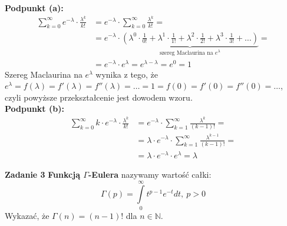 \documentclass[a4paper,12pt]{article}
\begin{document}
\noindent \textbf{Podpunkt (a):}
\begin{align*}
    \sum\limits_{k=0}^{\infty} e^{-\lambda} \cdot \frac{\lambda^k}{k!} &= 
    e^{-\lambda} \cdot \sum\limits_{k=0}^{\infty} \frac{\lambda^k}{k!} = \\ 
    &= e^{-\lambda} \cdot \underbrace{\left( \lambda^0 \cdot \frac{1}{0!} 
    + \lambda^1 \cdot \frac{1}{1!} + \lambda^2 \cdot \frac{1}{2!} 
    + \lambda^3 \cdot \frac{1}{3!} + \ldots \right)}_{\text{szereg Maclaurina na }
    e^\lambda} = \\
    &= e^{-\lambda} \cdot e^\lambda = e^{\lambda - \lambda} = e^0 = 1
\end{align*}
\noindent Szereg Maclaurina na $e^\lambda$ wynika z tego, że $e^\lambda = f(\lambda)
= f'(\lambda) = f''(\lambda) = \ldots = 1 = f(0) = f'(0) = f''(0) = \ldots$, czyli 
powyższe przekształcenie jest dowodem wzoru.\\

\noindent \textbf{Podpunkt (b):}
\begin{align*}
    \sum\limits_{k=0}^{\infty} k \cdot e^{-\lambda} \cdot \frac{\lambda^k}{k!} &=
    e^{-\lambda} \cdot \sum\limits_{k=1}^{\infty} \frac{\lambda^k}{(k-1)!} = \\
    &= \lambda \cdot e^{-\lambda} \cdot \sum\limits_{k=1}^{\infty} 
    \frac{\lambda^{k-1}}{(k-1)!} = \\
    &= \lambda \cdot e^{-\lambda} \cdot e^{\lambda} = \lambda
\end{align*}

\noindent \newline \textbf{Zadanie 3} \newline
\textbf{Funkcją $\Gamma$-Eulera} nazywamy wartość całki:
\[
    \Gamma (p) = \int\limits_{0}^{\infty} t^{p-1}e^{-t} dt, \ p > 0    
\]
Wykazać, że $\Gamma(n) = (n-1)!$ dla $n \in \mathbb{N}$. \\
\end{document}
